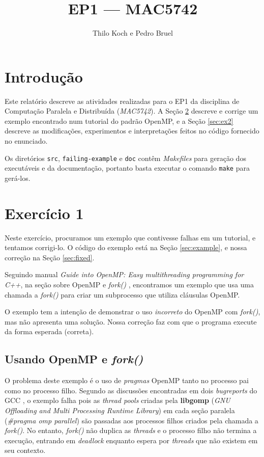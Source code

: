 \documentclass[a4paper, 12pt]{article}
\begin{document}
\hypersetup{backref,pdfpagemode=FullScreen,colorlinks=true}

\title{EP1 --- MAC5742}
\author{Thilo Koch e Pedro Bruel}
\date{}
\maketitle

\section{Introdução} \label{sec:intro}

Este relatório descreve as atividades realizadas
para o EP1 da disciplina de Computação Paralela e
Distribuída (\textit{MAC5742}). A Seção \ref{sec:ex1}
descreve e corrige um exemplo encontrado num tutorial do padrão
OpenMP, e a Seção \ref{sec:ex2} descreve as modificações,
experimentos e interpretações feitos no código fornecido no enunciado.

Os diretórios \texttt{src}, \texttt{failing-example} e \texttt{doc}
contêm \textit{Makefiles} para geração dos executáveis e da documentação,
portanto basta executar o comando \texttt{make} para gerá-los.

\section{Exercício 1} \label{sec:ex1}

Neste exercício, procuramos um exemplo que contivesse falhas em um
tutorial, e tentamos corrigi-lo. O código do exemplo está na Seção
\ref{sec:example}, e nossa correção na Seção \ref{sec:fixed}.

Seguindo manual \textit{Guide into OpenMP: Easy multithreading
programming for C++}, na seção sobre OpenMP e \textit{fork()}
\footnotemark[1],
encontramos um exemplo que usa uma chamada a \textit{fork()} para criar um
subprocesso que utiliza cláusulas OpenMP.

O exemplo tem a intenção de demonstrar o uso \textit{incorreto} do OpenMP
com \textit{fork()}, mas não apresenta uma solução.
Nossa correção faz com que o programa execute da forma esperada (correta).

\subsection{Usando OpenMP e \textit{fork()}}

O problema deste exemplo é o uso de \textit{pragmas} OpenMP tanto
no processo pai como no processo filho. Segundo as discussões
encontradas em dois \textit{bugreports} do GCC
\footnotemark[2]\footnotemark[3],
o exemplo falha pois as \textit{thread pools} criadas pela \textbf{libgomp}
(\textit{GNU Offloading and Multi Processing Runtime Library})
\footnotemark[4] em cada
seção paralela (\textit{\#pragma omp parallel}) são passadas aos processos
filhos criados pela chamada a \textit{fork()}. No entanto, \textit{fork()}
não duplica as \textit{threads} e o processo filho não termina a execução,
entrando em \textit{deadlock} enquanto espera por \textit{threads} que não
existem em seu contexto.
\end{document}
